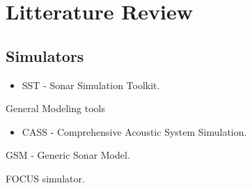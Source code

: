 
\chapter{Litterature Review}


\section{Simulators}



\begin{itemize}
\item SST - Sonar Simulation Toolkit. \cite{Goddard}
\end{itemize}

General Modeling tools
\begin{itemize}
\item CASS - Comprehensive Acoustic System Simulation. \cite{Goddard}
\end{itemize}


GSM - Generic Sonar Model. 


FOCUS simulator. 

